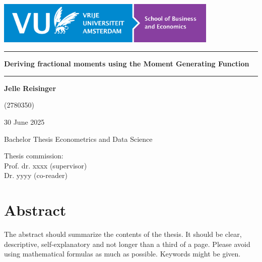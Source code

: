 \documentclass[a4paper,11pt]{article}
\theoremstyle{plain}
\numberwithin{theorem}{subsection}
\numberwithin{corollary}{subsection}
\numberwithin{proposition}{subsection}
\numberwithin{lemma}{subsection}
\numberwithin{assumption}{subsection}
\theoremstyle{definition}
\numberwithin{definition}{subsection}
\numberwithin{example}{subsection}
\numberwithin{remark}{subsection}
\numberwithin{notation}{subsection}
\begin{document}

\thispagestyle{empty}

\includegraphics[height=2cm]{figures/LogoSBE.png}

\vspace*{3cm}

\noindent
\rule{\textwidth}{0.8pt}
\begin{center}
{\huge\bf
\noindent
Deriving fractional moments using the Moment Generating Function
}
\end{center}

\vspace*{-8pt}
\noindent
\rule{\textwidth}{0.8pt}

\vspace*{2cm}

\begin{center}
{\LARGE\bf
Jelle Reisinger
}

{\Large
\vspace*{0.5cm}
(2780350)


\vspace*{2cm}

30 June 2025
}
\end{center}

\vspace*{2cm}

{\Large
\noindent
Bachelor Thesis Econometrics and Data Science
}

\vspace*{1cm}

{\Large
\noindent
Thesis commission:\\[0.3cm]
Prof. dr. xxxx (supervisor)\\[0.3cm]
Dr. yyyy (co-reader)
}


\newpage

\setcounter{page}{1}

\section*{Abstract}
The abstract should summarize the contents of the thesis.
It should be clear, descriptive, self-explanatory and not longer
than a third of a page. Please avoid using mathematical
formulas as much as possible.
Keywords might be given.
\end{document}
